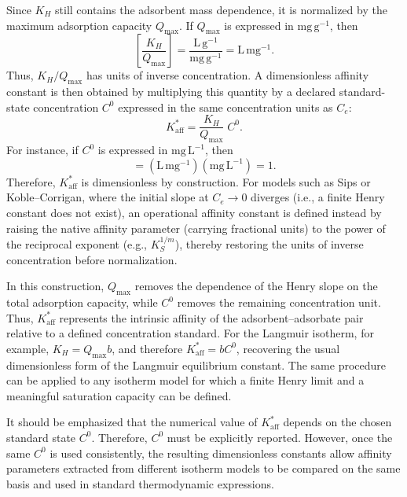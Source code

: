 \documentclass[journal=jacsat,manuscript=article]{achemso}
\begin{document}
Since $K_H$ still contains the adsorbent mass dependence, it is normalized by the maximum adsorption capacity $Q_{\max}$. If $Q_{\max}$ is expressed in $\mathrm{mg\,g^{-1}}$, then
\begin{equation}
	\left[\frac{K_H}{Q_{\max}}\right]
	=
	\frac{\mathrm{L\,g^{-1}}}{\mathrm{mg\,g^{-1}}}
	=
	\mathrm{L\,mg^{-1}}.
	\label{eq:Kaff_units}
\end{equation}
Thus, $K_H/Q_{\max}$ has units of inverse concentration. A dimensionless affinity constant is then obtained by multiplying this quantity by a declared standard-state concentration $C^0$ expressed in the same concentration units as $C_e$:
\begin{equation}
	K_{\mathrm{aff}}^{\ast}
	= \frac{K_H}{Q_{\max}}\; C^{0}.
	\label{eq:Kaff_star}
\end{equation}
For instance, if $C^0$ is expressed in $\mathrm{mg\,L^{-1}}$, then
\begin{equation}
	[K_{\mathrm{aff}}^{\ast}]
	=
	\left(\mathrm{L\,mg^{-1}}\right)
	\left(\mathrm{mg\,L^{-1}}\right)
	=
	1.
	\label{eq:Kaff_dimensionless}
\end{equation}
Therefore, $K_{\mathrm{aff}}^{\ast}$ is dimensionless by construction. For models such as Sips or Koble--Corrigan, where the initial slope at $C_e \to 0$ diverges (i.e., a finite Henry constant does not exist), an operational affinity constant is defined instead by raising the native affinity parameter (carrying fractional units) to the power of the reciprocal exponent (e.g., $K_S^{1/m}$), thereby restoring the units of inverse concentration before normalization.

In this construction, $Q_{\max}$ removes the dependence of the Henry slope on the total adsorption capacity, while $C^0$ removes the remaining concentration unit. Thus, $K_{\mathrm{aff}}^{\ast}$ represents the intrinsic affinity of the adsorbent--adsorbate pair relative to a defined concentration standard. For the Langmuir isotherm, for example, $K_H = Q_{\max} b$, and therefore $K_{\mathrm{aff}}^{\ast}=bC^{0}$, recovering the usual dimensionless form of the Langmuir equilibrium constant. The same procedure can be applied to any isotherm model for which a finite Henry limit and a meaningful saturation capacity can be defined.

It should be emphasized that the numerical value of $K_{\mathrm{aff}}^{\ast}$ depends on the chosen standard state $C^{0}$. Therefore, $C^{0}$ must be explicitly reported. However, once the same $C^{0}$ is used consistently, the resulting dimensionless constants allow affinity parameters extracted from different isotherm models to be compared on the same basis and used in standard thermodynamic expressions.
	
\end{document}
